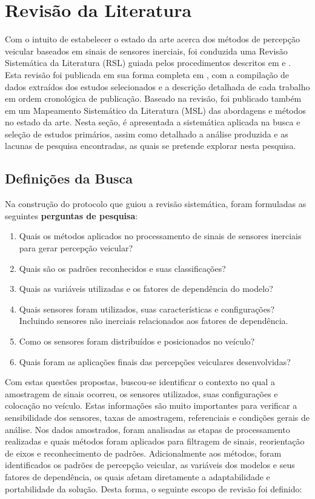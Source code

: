 \chapter{Revisão da Literatura}
\label{cap:revisao}

Com o intuito de estabelecer o estado da arte acerca dos métodos de percepção veicular baseados em sinais de sensores inerciais, foi conduzida uma Revisão Sistemática da Literatura (RSL) guiada pelos procedimentos descritos em \cite{kitchenham2009} e \cite{biolchini2005}. Esta revisão foi publicada em sua forma completa em \cite{menegazzo2018}, com a compilação de dados extraídos dos estudos selecionados e a descrição detalhada de cada trabalho em ordem cronológica de publicação. Baseado na revisão, foi publicado também em \cite{menegazzo2020} um Mapeamento Sistemático da Literatura (MSL) das abordagens e métodos no estado da arte. Nesta seção, é apresentada a sistemática aplicada na busca e seleção de estudos primários, assim como detalhado a análise produzida e as lacunas de pesquisa encontradas, as quais se pretende explorar nesta pesquisa. 

\section{Definições da Busca}

Na construção do protocolo que guiou a revisão sistemática, foram formuladas as seguintes \textbf{perguntas de pesquisa}:

\begin{enumerate}
\item Quais os métodos aplicados no processamento de sinais de sensores inerciais para gerar percepção veicular?
\item Quais são os padrões reconhecidos e suas classificações?
\item Quais as variáveis utilizadas e os fatores de dependência do modelo?
\item Quais sensores foram utilizados, suas características e configurações? Incluindo sensores não inerciais relacionados aos fatores de dependência.
\item Como os sensores foram distribuídos e posicionados no veículo?
\item Quais foram as aplicações finais das percepções veiculares desenvolvidas?
\end{enumerate}

Com estas questões propostas, buscou-se identificar o contexto no qual a amostragem de sinais ocorreu, os sensores utilizados, suas configurações e colocação no veículo. Estas informações são muito importantes para verificar a sensibilidade dos sensores, taxas de amostragem, referenciais e condições gerais de análise. Nos dados amostrados, foram analisadas as etapas de processamento realizadas e quais métodos foram aplicados para filtragem de sinais, reorientação de eixos e reconhecimento de padrões. Adicionalmente aos métodos, foram identificados os padrões de percepção veicular, as variáveis dos modelos e seus fatores de dependência, os quais afetam diretamente a adaptabilidade e portabilidade da solução. Desta forma, o seguinte escopo de revisão foi definido:

